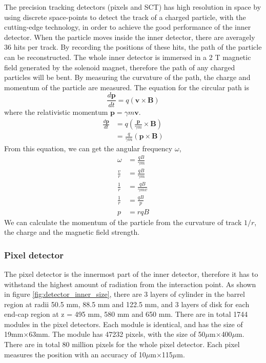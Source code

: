 The precision tracking detectors (pixels and SCT) has high resolution in space by using discrete space-points to detect the track of a charged particle, with the cutting-edge technology, in order to achieve the good performance of the inner detector.
When the particle moves inside the inner detector, there are averagely 36 hits per track.
By recording the positions of these hits, the path of the particle can be reconstructed.
The whole inner detector is immersed in a 2 T magnetic field generated by the solenoid magnet, therefore the path of any charged particles will be bent.
By measuring the curvature of the path, the charge and momentum of the particle are measured.
The equation for the circular path is
\begin{equation}
\frac{d\mathbf{p}}{dt} = q(\mathbf{v} \times \mathbf{B})
\end{equation}
where the relativistic momentum $\mathbf{p} = \gamma m \mathbf{v}$.
\begin{align}
\frac{d\mathbf{p}}{dt} &= q( \frac{\mathbf{p}}{\gamma m} \times \mathbf{B}) \\
&= \frac{q}{\gamma m} (\mathbf{p} \times \mathbf{B})
\end{align}
From this equation, we can get the angular frequency $\omega$,
\begin{align}
\omega &= \frac{qB}{\gamma m} \\
\frac{v}{r} &= \frac{qB}{\gamma m} \\
\frac{1}{r} &= \frac{qB}{\gamma m v} \\
\frac{1}{r} &= \frac{qB}{p} \\
p &= rqB
\end{align}
We can calculate the momentum of the particle from the curvature of track $1/r$, the charge and the magnetic field strength.

\subsubsection{Pixel detector}
The pixel detector is the innermost part of the inner detector, therefore it has to withstand the highest amount of radiation from the interaction point.
As shown in figure \ref{fig:detector_inner_size}, there are 3 layers of cylinder in the barrel region at radii 50.5 mm, 88.5 mm and 122.5 mm, and 3 layers of disk for each end-cap region at z = 495 mm, 580 mm and 650 mm.
There are in total 1744 modules in the pixel detectors.
Each module is identical, and has the size of 19mm$\times$63mm.
The module has 47232 pixels, with the size of 50$\mu$m$\times$400$\mu$m.
There are in total 80 million pixels for the whole pixel detector.
Each pixel measures the position with an accuracy of 10$\mu$m$\times$115$\mu$m.

